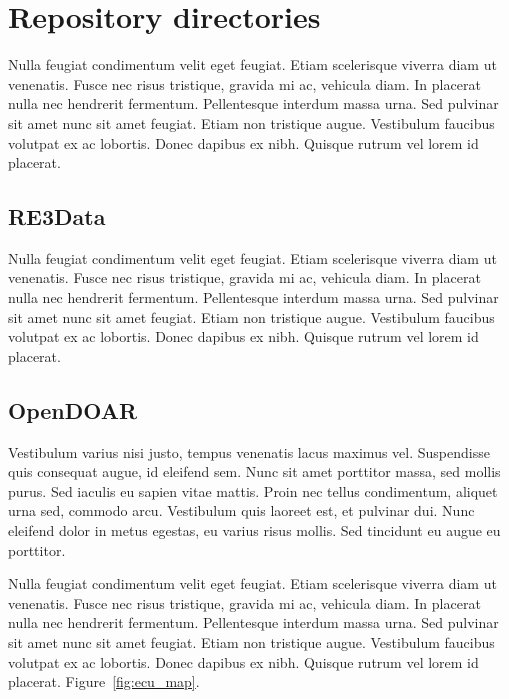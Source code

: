 
\section{Repository directories} %
\label{sec:repository_directories}

Nulla feugiat condimentum velit eget feugiat. Etiam scelerisque viverra diam ut venenatis. Fusce nec risus tristique, gravida mi ac, vehicula diam. In placerat nulla nec hendrerit fermentum. Pellentesque interdum massa urna. Sed pulvinar sit amet nunc sit amet feugiat. Etiam non tristique augue. Vestibulum faucibus volutpat ex ac lobortis. Donec dapibus ex nibh. Quisque rutrum vel lorem id placerat.

\subsection{RE3Data} %
\label{sub:re3data}


Nulla feugiat condimentum velit eget feugiat. Etiam scelerisque viverra diam ut venenatis. Fusce nec risus tristique, gravida mi ac, vehicula diam. In placerat nulla nec hendrerit fermentum. Pellentesque interdum massa urna. Sed pulvinar sit amet nunc sit amet feugiat. Etiam non tristique augue. Vestibulum faucibus volutpat ex ac lobortis. Donec dapibus ex nibh. Quisque rutrum vel lorem id placerat.


\subsection{OpenDOAR} %
\label{sub:opendoar}

Vestibulum varius nisi justo, tempus venenatis lacus maximus vel. Suspendisse quis consequat augue, id eleifend sem. Nunc sit amet porttitor massa, sed mollis purus. Sed iaculis eu sapien vitae mattis. Proin nec tellus condimentum, aliquet urna sed, commodo arcu. Vestibulum quis laoreet est, et pulvinar dui. Nunc eleifend dolor in metus egestas, eu varius risus mollis. Sed tincidunt eu augue eu porttitor.

Nulla feugiat condimentum velit eget feugiat. Etiam scelerisque viverra diam ut venenatis. Fusce nec risus tristique, gravida mi ac, vehicula diam. In placerat nulla nec hendrerit fermentum. Pellentesque interdum massa urna. Sed pulvinar sit amet nunc sit amet feugiat. Etiam non tristique augue. Vestibulum faucibus volutpat ex ac lobortis. Donec dapibus ex nibh. Quisque rutrum vel lorem id placerat. Figure~\ref{fig:ecu_map}.

